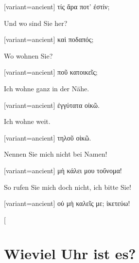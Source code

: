 \begin{greek}[variant=ancient]%
τίς ἄρα ποτ' ἐστίν;

\end{greek}%
\switchcolumn*

Und wo sind Sie her?

\switchcolumn

\begin{greek}[variant=ancient]%
καὶ ποδαπός;

\end{greek}%
\switchcolumn*

Wo wohnen Sie?

\switchcolumn

\begin{greek}[variant=ancient]%
ποῦ κατοικεῖς;

\end{greek}%
\switchcolumn*

Ich wohne ganz in der Nähe.

\switchcolumn

\begin{greek}[variant=ancient]%
ἐγγύτατα οἰκῶ.

\end{greek}%
\switchcolumn*

Ich wohne weit.

\switchcolumn

\begin{greek}[variant=ancient]%
τηλοῦ οἰκῶ.

\end{greek}%
\switchcolumn*

Nennen Sie mich nicht bei Namen!

\switchcolumn

\begin{greek}[variant=ancient]%
μὴ κάλει μου τοὔνομα!

\end{greek}%
\switchcolumn*

So rufen Sie mich doch nicht, ich bitte Sie!

\switchcolumn

\begin{greek}[variant=ancient]%
οὐ μὴ καλεῖς με; ἱκετεύω!

\end{greek}%
\switchcolumn*[


\section{Wieviel Uhr ist es?}


